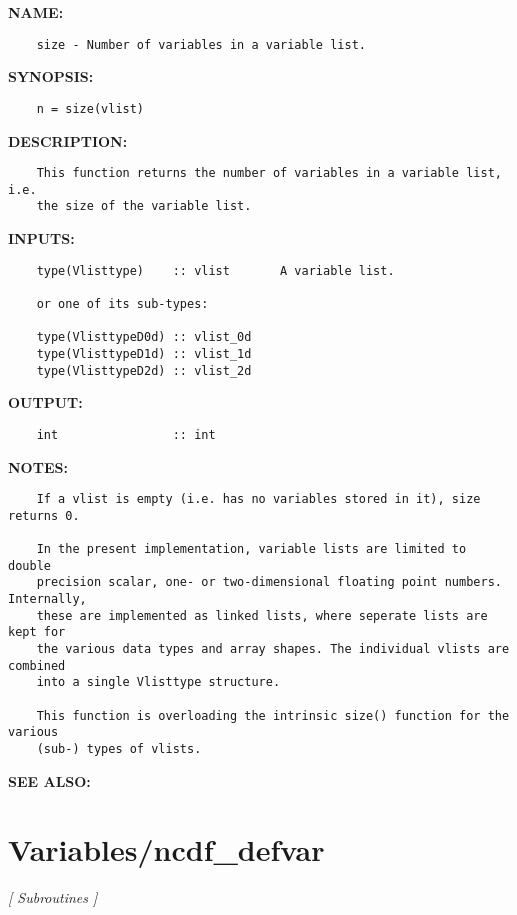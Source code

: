 \label{ch:robo112}
\label{ch:Variable_lists_size}
\textbf{NAME:}\hspace{0.08in}\begin{Verbatim}
    size - Number of variables in a variable list.
\end{Verbatim}
\textbf{SYNOPSIS:}\hspace{0.08in}\begin{Verbatim}
    n = size(vlist)
\end{Verbatim}
\textbf{DESCRIPTION:}\hspace{0.08in}\begin{Verbatim}
    This function returns the number of variables in a variable list, i.e.
    the size of the variable list.
\end{Verbatim}
\textbf{INPUTS:}\hspace{0.08in}\begin{Verbatim}
    type(Vlisttype)    :: vlist       A variable list.

    or one of its sub-types:

    type(VlisttypeD0d) :: vlist_0d
    type(VlisttypeD1d) :: vlist_1d
    type(VlisttypeD2d) :: vlist_2d
\end{Verbatim}
\textbf{OUTPUT:}\hspace{0.08in}\begin{Verbatim}
    int                :: int
\end{Verbatim}
\textbf{NOTES:}\hspace{0.08in}\begin{Verbatim}
    If a vlist is empty (i.e. has no variables stored in it), size returns 0.

    In the present implementation, variable lists are limited to double
    precision scalar, one- or two-dimensional floating point numbers. Internally,
    these are implemented as linked lists, where seperate lists are kept for
    the various data types and array shapes. The individual vlists are combined
    into a single Vlisttype structure.

    This function is overloading the intrinsic size() function for the various
    (sub-) types of vlists.
\end{Verbatim}
\textbf{SEE ALSO:}\hspace{0.08in}\section{Variables/ncdf\_defvar}
\textsl{[ Subroutines ]}

